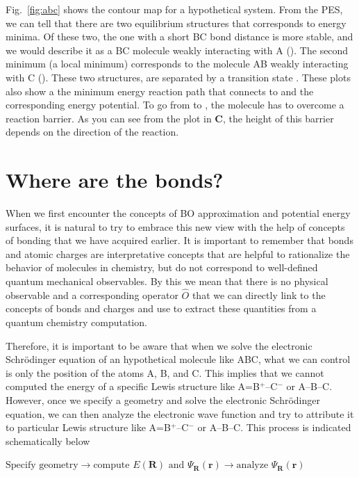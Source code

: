 \documentclass[../Main/notes.tex]{subfiles}
\begin{document}
Fig.~\ref{fig:abc} shows the contour map for a hypothetical  system.
From the PES, we can tell that there are two equilibrium structures that corresponds to energy minima.
Of these two, the one with a short BC bond distance is more stable, and we would describe it as a BC molecule weakly interacting with A ().
The second minimum (a local minimum) corresponds to the molecule AB weakly interacting with C ().
These two structures, are separated by a transition state .
These plots also show a the minimum energy reaction path that connects  to  and the corresponding energy potential.
To go from  to , the molecule has to overcome a reaction barrier.
As you can see from the plot in \textbf{C}, the height of this barrier depends on the direction of the reaction.

\section{Where are the bonds?}

When we first encounter the concepts of BO approximation and potential energy surfaces, it is natural to try to embrace this new view with the help of concepts of bonding that we have acquired earlier.
It is important to remember that bonds and atomic charges are interpretative concepts that are helpful to rationalize the behavior of molecules in chemistry, but do not correspond to well-defined quantum mechanical observables.
By this we mean that there is no physical observable and a corresponding operator $\hat{O}$ that we can directly link to the concepts of bonds and charges and use to extract these quantities from a quantum chemistry computation.

Therefore, it is important to be aware that when we solve the electronic Schr\"{o}dinger equation of an hypothetical molecule like ABC, what we can control is only the position of the atoms A, B, and C.
This implies that we cannot computed the energy of a specific Lewis structure like A=B$^+$--C$^-$ or A--B--C.
However, once we specify a geometry and solve the electronic Schr\"{o}dinger equation, we can then analyze the electronic wave function and try to attribute it to particular Lewis structure like A=B$^+$--C$^-$ or A--B--C.
This process is indicated schematically below

\begin{ibox}
\begin{center}
$\text{Specify geometry} \rightarrow \text{compute } E(\mathbf{R}) \text{ and } \Psi_\mathbf{R}(\mathbf{r}) \rightarrow \text{analyze } \Psi_\mathbf{R}(\mathbf{r})$
\end{center}
\end{ibox}
\end{document}
